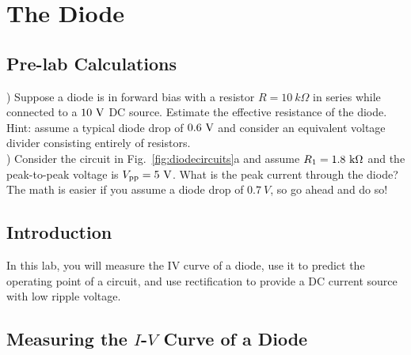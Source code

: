\chapter{The Diode}

\section{Pre-lab Calculations}
) Suppose a diode is in forward bias with a resistor $R=10~k\Omega$ in series while connected to a $10~\rm V$ DC source.  Estimate the effective resistance of the diode.  Hint: assume a typical diode drop of $0.6~\rm V$ and consider an equivalent voltage divider consisting entirely of resistors. \\ 

) Consider the circuit in Fig.~\ref{fig:diodecircuits}a and assume $R_1=1.8~\rm k \Omega$ and the peak-to-peak voltage is $V_{\rm pp} = 5~\rm V$.  What is the peak current through the diode?  The math is easier if you assume a diode drop of $0.7~V$, so go ahead and do so! \\

\section{Introduction}

In this lab, you will measure the IV curve of a diode, use it to
predict the operating point of a circuit, and use rectification to
provide a DC current source with low ripple voltage.

\section{Measuring the $I$-$V$ Curve of a Diode}

